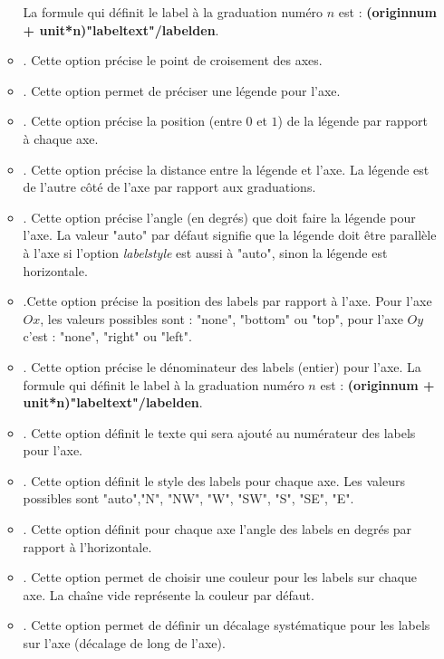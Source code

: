 \documentclass[%
10pt,%
a4paper,%
french,%
]%
{article}%
\begin{document}
\begin{itemize}
\begin{itemize}
            La formule qui définit le label à la graduation numéro $n$ est : \textbf{(originnum + unit*n)"labeltext"/labelden}.
            \item {}. Cette option précise le point de croisement des axes.
            \item {}. Cette option permet de préciser une légende pour l'axe.
            \item {}. Cette option précise la position (entre $0$ et $1$) de la légende par rapport à chaque axe.
            \item {}. Cette option précise la distance entre la légende et l'axe. La légende est de l'autre côté de l'axe par rapport aux graduations.
            \item {}. Cette option précise l'angle (en degrés) que doit faire la légende pour l'axe. La valeur "auto" par défaut signifie que la légende doit être parallèle à l'axe si l'option \emph{labelstyle} est aussi à "auto", sinon la légende est horizontale.
            \item {}.Cette option précise la position des labels par rapport à l'axe. Pour l'axe $Ox$, les valeurs possibles sont : "none", "bottom" ou "top", pour l'axe $Oy$ c'est :  "none", "right" ou "left".
            \item {}. Cette option précise le dénominateur des labels (entier) pour l'axe. La formule qui définit le label à la graduation numéro $n$ est : \textbf{(originnum + unit*n)"labeltext"/labelden}.
            \item {}. Cette option définit le texte qui sera ajouté au numérateur des labels pour l'axe.
            \item {}. Cette option définit le style des labels pour chaque axe. Les valeurs possibles sont "auto","N", "NW", "W", "SW", "S", "SE", "E".
            \item {}. Cette option définit pour chaque axe l'angle des labels en degrés par rapport à l'horizontale.
            \item {}. Cette option permet de choisir une couleur pour les labels sur chaque axe. La chaîne vide représente la couleur par défaut.
            \item {}. Cette option permet de définir un décalage systématique pour les labels sur l'axe (décalage de long de l'axe).

\end{itemize}
\end{itemize}
\end{document}
